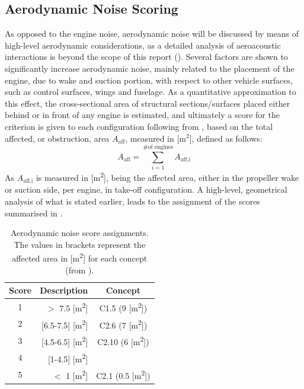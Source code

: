 \subsection{Aerodynamic Noise Scoring}
\label{par:aeroscoring} 
As opposed to the engine noise, aerodynamic noise will be discussed by means of high-level aerodynamic considerations, as a detailed analysis of aeroacoustic interactions is beyond the scope of this report (). Several factors are shown to significantly increase aerodynamic noise, mainly related to the placement of the engine, due to wake and suction portion, with respect to other vehicle surfaces, such as control surfaces, wings and fuselage.
As a quantitative approximation to this effect, the cross-sectional area of structural sections/surfaces placed either behind or in front of any engine is estimated, and ultimately a score for the criterion is given to each configuration following from , based on the total affected, or obstruction, area $A_{\text{aff}}$, measured in [$\text{m}^2$], defined as follows:
\begin{equation}
\label{eq:totalaffarea}
     A_{\text{aff}}=\sum_{i=1}^{\text{\# of engines}}A_{\text{aff,i}}
\end{equation}
As $A_{\text{aff,i}}$ is measured in [\unit{m^2}], being the affected area, either in the propeller wake or suction side, per engine, in take-off configuration.
A high-level, geometrical analysis of what is stated earlier, leads to the assignment of the scores summarised in .
\begin{table}[ht]
\centering
\caption{Aerodynamic noise score assignments. The values in brackets represent the affected area in [\unit{\m^2}] for each concept (from ).}
\label{tab:aeronoisescores}
\begin{tabular}{c|r|c}
\toprule
  
\textbf{Score} & \multicolumn{1}{c|}{\textbf{Description}} & \textbf{Concept} \\ \bottomrule
\rowcolor[HTML]{FD6864} 
1              & $>$ 7.5 [\unit{\m^2}]                 & C1.5 (9 [\unit{\m^2}])             \\
\rowcolor[HTML]{FCBF7B} 
2              & [6.5-7.5] [\unit{\m^2}]              & C2.6 (7 [\unit{\m^2}])             \\
\rowcolor[HTML]{E0E383} 
3              & [4.5-6.5] [\unit{\m^2}]              & C2.10 (6 [\unit{\m^2}])            \\
\rowcolor[HTML]{A2D07F} 
4              & [1-4.5] [\unit{\m^2}]                &                     \\
\rowcolor[HTML]{63BE7B} 
5              & $<$ 1 [\unit{\m^2}]                   & C2.1 (0.5 [\unit{\m^2}])             \\ \toprule
\end{tabular}
\end{table}

